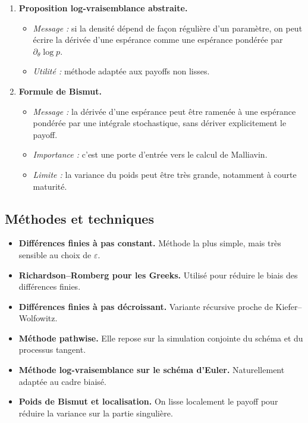 \documentclass[11pt,a4paper]{article}
\begin{document}
\begin{enumerate}[label=\textbf{\arabic*.}]
  \item \textbf{Proposition log-vraisemblance abstraite.}
  \begin{itemize}
    \item \emph{Message :} si la densité dépend de façon régulière d'un paramètre, on peut écrire la dérivée d'une espérance comme une espérance pondérée par $\partial_\theta \log p$.
    \item \emph{Utilité :} méthode adaptée aux payoffs non lisses.
  \end{itemize}

  \item \textbf{Formule de Bismut.}
  \begin{itemize}
    \item \emph{Message :} la dérivée d'une espérance peut être ramenée à une espérance pondérée par une intégrale stochastique, sans dériver explicitement le payoff.
    \item \emph{Importance :} c'est une porte d'entrée vers le calcul de Malliavin.
    \item \emph{Limite :} la variance du poids peut être très grande, notamment à courte maturité.
  \end{itemize}
\end{enumerate}

\subsection{Méthodes et techniques}

\begin{itemize}
  \item \textbf{Différences finies à pas constant.} Méthode la plus simple, mais très sensible au choix de $\varepsilon$.
  \item \textbf{Richardson--Romberg pour les Greeks.} Utilisé pour réduire le biais des différences finies.
  \item \textbf{Différences finies à pas décroissant.} Variante récursive proche de Kiefer--Wolfowitz.
  \item \textbf{Méthode pathwise.} Elle repose sur la simulation conjointe du schéma et du processus tangent.
  \item \textbf{Méthode log-vraisemblance sur le schéma d'Euler.} Naturellement adaptée au cadre biaisé.
  \item \textbf{Poids de Bismut et localisation.} On lisse localement le payoff pour réduire la variance sur la partie singulière.
\end{itemize}
\end{document}
